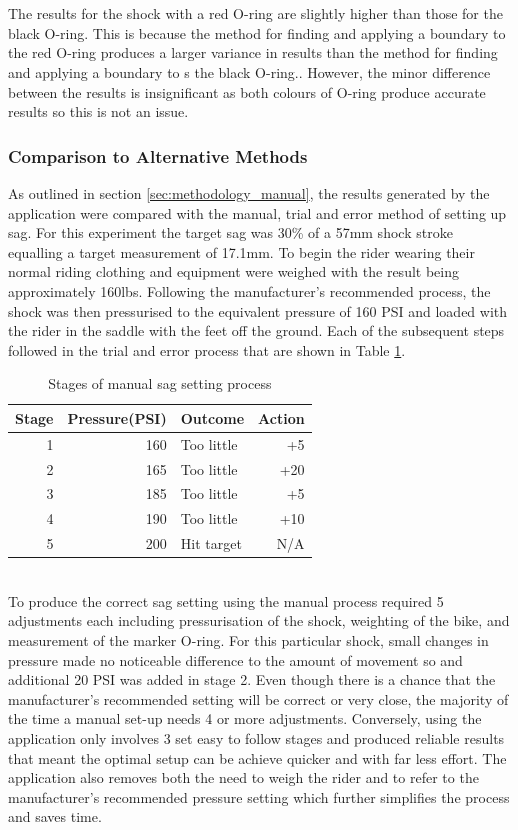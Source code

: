 			\\\\
			The results for the shock with a red O-ring are slightly higher than those for the black O-ring. This is because  the method for finding and applying a boundary to the red O-ring produces a larger variance in results than the method for finding and applying a boundary to s the black O-ring.. However, the minor difference between the results is insignificant as both colours of O-ring produce  accurate results so this is  not an issue.
		\subsubsection{Comparison to Alternative Methods}
			As outlined in section \ref{sec:methodology_manual}, the results generated by the application were compared with the manual, trial and error method of setting up sag. For this experiment the target sag was 30\% of a 57mm shock stroke equalling a target measurement of 17.1mm. To begin the rider wearing their normal riding clothing and equipment were weighed with  the result  being  approximately 160lbs. Following the manufacturer’s recommended process, the shock was then pressurised to the equivalent pressure of 160 PSI and loaded  with the  rider in the saddle with the feet off the ground. Each of the subsequent steps followed in the trial and error process that are shown in Table \ref{tab:manual_process}.
			\begin{table}[h!]
				\centering
				\caption{Stages of manual sag setting process}
				\label{tab:manual_process}
				\begin{tabular}{|r|r|l|r|}
					\hline
					\bfseries Stage&\bfseries Pressure(PSI)&\bfseries Outcome&\bfseries Action\\
					\hline
					1&160&Too little&+5\\
					2&165&Too little&+20\\
					3&185&Too little&+5\\
					4&190&Too little&+10\\
					5&200&Hit target&N/A\\
					\hline
				\end{tabular}
			\end{table}\\
			To produce the correct sag setting using the manual process required 5 adjustments each including pressurisation of the shock, weighting of the bike, and measurement of the marker O-ring. For this particular shock, small changes in pressure made no noticeable difference to the amount of movement so and additional  20 PSI was added in stage 2. Even though there is a chance that the manufacturer’s recommended setting will be correct or very close, the majority of the time a manual set-up  needs 4 or more  adjustments. Conversely, using the  application only involves  3 set easy to follow stages and produced reliable results that meant the optimal setup can be achieve quicker and with far less effort. The application also removes both the need to  weigh the rider and to refer to the manufacturer’s recommended pressure setting which further simplifies the process and saves time. 
